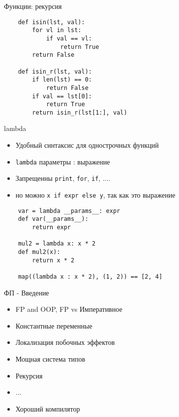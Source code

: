 \documentclass{article}
\begin{document}
\begin{center} Функции: рекурсия \end{center}
\vspace{15pt}
\begin{lstlisting}
    def isin(lst, val):
        for vl in lst:
            if val == vl:
                return True
        return False

    def isin_r(lst, val):
        if len(lst) == 0:
            return False
        if val == lst[0]:
            return True
        return isin_r(lst[1:], val)
\end{lstlisting}
\newpage


\begin{center} lambda \end{center}
\begin{itemize}
    \item Удобный синтаксис для однострочных функций
    \item \lstinline!lambda! параметры : выражение
    \item Запрещенны \lstinline!print!, \lstinline!for!, \lstinline!if!, ....
    \item но можно \lstinline!x if expr else y!, так как это выражение
\end{itemize}
\vspace{15pt}
\begin{lstlisting}
    var = lambda __params__: expr
    def var(__params__):
        return expr

    mul2 = lambda x: x * 2
    def mul2(x):
        return x * 2

    map((lambda x : x * 2), (1, 2)) == [2, 4]
\end{lstlisting}
\newpage

\begin{center} ФП - Введение \end{center}
\begin{itemize}
    \item FP and OOP, FP vs Императивное
    \item Константные переменные
    \item Локализация побочных эффектов
    \item Мощная система типов
    \item Рекурсия
    \item ...
    \item Хороший компилятор
\end{itemize}
\newpage
\end{document}
